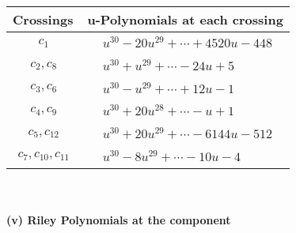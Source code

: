 \documentclass[1p]{elsarticle_modified}
\theoremstyle{definition}
\begin{document}
\begin{tabular}{m{50pt}|m{274pt}}
Crossings & \hspace{64pt}u-Polynomials at each crossing \\
\hline $$\begin{aligned}c_{1}\end{aligned}$$&$\begin{aligned}
&u^{30}-20 u^{29}+\cdots+4520 u-448
\end{aligned}$\\
\hline $$\begin{aligned}c_{2},c_{8}\end{aligned}$$&$\begin{aligned}
&u^{30}+u^{29}+\cdots-24 u+5
\end{aligned}$\\
\hline $$\begin{aligned}c_{3},c_{6}\end{aligned}$$&$\begin{aligned}
&u^{30}- u^{29}+\cdots+12 u-1
\end{aligned}$\\
\hline $$\begin{aligned}c_{4},c_{9}\end{aligned}$$&$\begin{aligned}
&u^{30}+20 u^{28}+\cdots- u+1
\end{aligned}$\\
\hline $$\begin{aligned}c_{5},c_{12}\end{aligned}$$&$\begin{aligned}
&u^{30}+20 u^{29}+\cdots-6144 u-512
\end{aligned}$\\
\hline $$\begin{aligned}c_{7},c_{10},c_{11}\end{aligned}$$&$\begin{aligned}
&u^{30}-8 u^{29}+\cdots-10 u-4
\end{aligned}$\\
\hline
\end{tabular}\\~\\
\newpage\renewcommand{\arraystretch}{1}
\flushleft \textbf{(v) Riley Polynomials at the component}\newline \\
\end{document}
